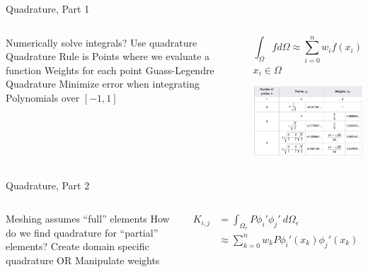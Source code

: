 \placelogofalse
\begin{frame}{Quadrature, Part 1}
\begin{columns}
\begin{outline}
  \1 Numerically solve integrals?
  \2 Use quadrature
  \1 Quadrature Rule is
  \2 Points where we evaluate a function
  \2 Weights for each point
  \1 Guass-Legendre Quadrature 
  \2 Minimize error when integrating Polynomials over $[-1, 1]$
\end{outline}

\begin{center}
$$
\int_{\Omega} f d \Omega \approx \sum_{i=0}^n w_i f(x_i)
$$
$x_i \in \Omega$

\vspace{1cm}

\includegraphics[width=5cm]{quadrature_table.png}

\end{center}
\end{columns}
\end{frame}
\placelogotrue

\begin{frame}{Quadrature, Part 2}
\begin{columns}
\begin{outline}
  \1 Meshing assumes ``full'' elements 
  \1 How do we find quadrature for ``partial'' elements?
  \2 Create domain specific quadrature
  \2 OR
  \2 Manipulate weights
\end{outline}

\begin{center}

\begin{align*}
K_{i,j} &= \int_{\Omega_e} P \phi_i' \phi_j' \ d \Omega_e \\
        &\approx \sum_{k=0}^n w_k P \phi_i'(x_k) \phi_j'(x_k)
\end{align*}

\end{center}
\end{columns}
\end{frame}


